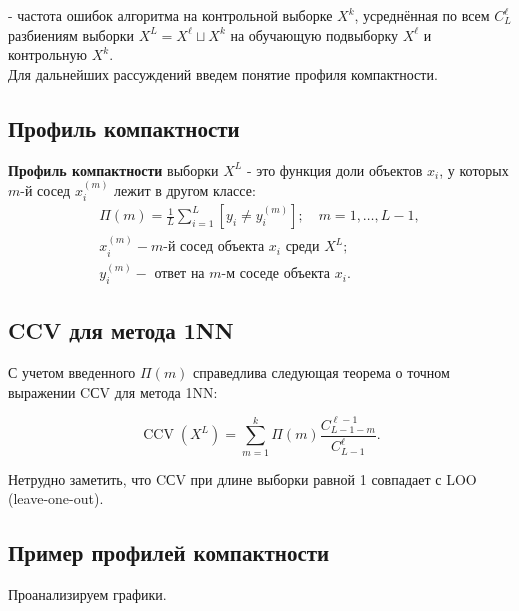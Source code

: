 \noindent
- частота ошибок алгоритма на контрольной выборке $X^k$, усреднённая по всем $C_L^{\ell}$ разбиениям выборки $X^L=X^{\ell} \sqcup X^k$ на обучающую подвыборку $X^{\ell}$ и контрольную $X^k$. \\

\noindent
Для дальнейших рассуждений введем понятие профиля компактности.


\subsection{Профиль компактности}

\noindent
\textbf{Профиль компактности} выборки $X^L$ - это функция доли объектов $x_i$, у которых $m$-й сосед $x_i^{(m)}$ лежит в другом классе: $$ \begin{gathered} \Pi(m)=\frac{1}{L} \sum_{i=1}^L\left[y_i \neq y_i^{(m)}\right] ; \quad m=1, \ldots, L-1, \\ x_i^{(m)}-m \text {-й сосед объекта } x_i \text { среди } X^L ; \\ y_i^{(m)}-\text { ответ на } m \text {-м соседе объекта } x_i . \end{gathered} $$


\subsection{CCV для метода 1NN}

\noindent
С учетом введенного $\Pi(m)$ справедлива следующая теорема о точном выражении CСV для метода 1NN:

\begin{equation*}
	\operatorname{CCV}\left(X^L\right)=\sum_{m=1}^k \Pi(m) \frac{C_{L-1-m}^{\ell-1}}{C_{L-1}^{\ell}} .
\end{equation*}

\noindent
Нетрудно заметить, что CСV при длине выборки равной 1 совпадает с LOO (leave-one-out).


\subsection{Пример профилей компактности}

\noindent
Проанализируем графики.


